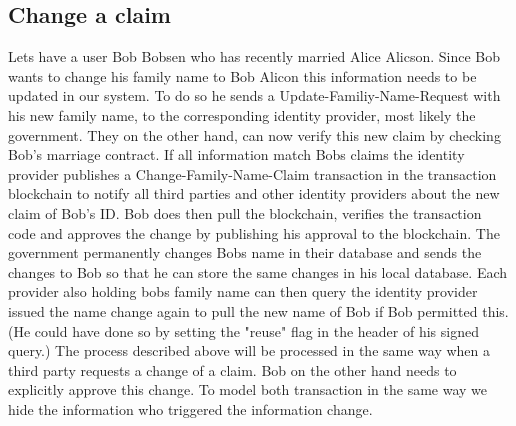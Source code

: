 \subsection{Change a claim}
Lets have a user Bob Bobsen who has recently married Alice Alicson. Since Bob wants to change his family name to Bob Alicon this information needs to be updated in our system. To do so he sends a Update-Familiy-Name-Request with his new family name, to the corresponding identity provider, most likely the government. They on the other hand, can now verify this new claim by checking Bob's marriage contract. If all information match Bobs claims the identity provider publishes a Change-Family-Name-Claim transaction in the transaction blockchain to notify all third parties and other identity providers about the new claim of Bob's ID. 
Bob does then pull the blockchain, verifies the transaction code and approves the change by publishing his approval to the blockchain. The government permanently changes Bobs name in their database and sends the changes to Bob so that he can store the same changes in his local database. 
Each provider also holding bobs family name can then query the identity provider issued the name change again to pull the new name of Bob if Bob permitted this. (He could have done so by setting the "reuse" flag in the header of his signed query.)
The process described above will be processed in the same way when a third party requests a change of a claim. Bob on the other hand needs to explicitly approve this change. To model both transaction in the same way we hide the information who triggered the information change.
